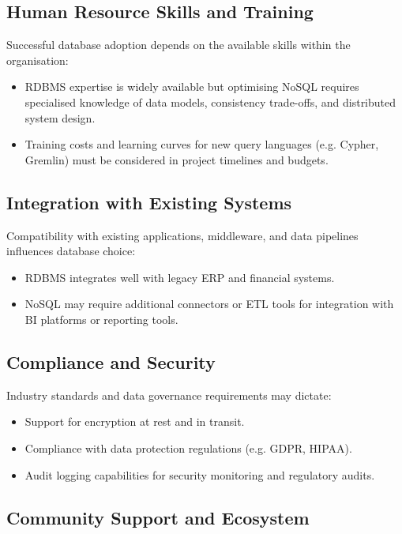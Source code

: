 \subsection{Human Resource Skills and Training}

Successful database adoption depends on the available skills within the organisation:
\begin{itemize}
	\item RDBMS expertise is widely available but optimising NoSQL requires specialised knowledge of data models, consistency trade-offs, and distributed system design.
	\item Training costs and learning curves for new query languages (e.g. Cypher, Gremlin) must be considered in project timelines and budgets.
\end{itemize}

\subsection{Integration with Existing Systems}

Compatibility with existing applications, middleware, and data pipelines influences database choice:
\begin{itemize}
	\item RDBMS integrates well with legacy ERP and financial systems.
	\item NoSQL may require additional connectors or ETL tools for integration with BI platforms or reporting tools.
\end{itemize}

\subsection{Compliance and Security}

Industry standards and data governance requirements may dictate:
\begin{itemize}
	\item Support for encryption at rest and in transit.
	\item Compliance with data protection regulations (e.g. GDPR, HIPAA).
	\item Audit logging capabilities for security monitoring and regulatory audits.
\end{itemize}

\subsection{Community Support and Ecosystem}

